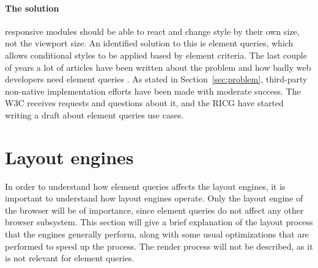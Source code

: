 \documentclass[a4paper,11pt]{kth-mag}
\begin{document}
        \paragraph{The solution}
        \Gls{responsive} modules should be able to react and change style by their own size, not the \gls{viewport} size.
        An identified solution to this is element queries, which allows conditional styles to be applied based by \gls{element} criteria.
        The last couple of years a lot of articles have been written about the problem and how badly \gls{web} developers need element queries \cite{eq_article_localised-css,eq_article_backalley,eq_article_mqhack,eq_article_tabatkjr,eq_article_filament,eq_article_tyson,eq_article_neal,eq_article_css-tricks,eq_article_hugo,eq_article_fremycompany,eq_article_discource,eq_article_matt}.
        As stated in Section~\ref{sec:problem}, \gls{third-party} non-\gls{native} implementation efforts have been made with moderate success.
        The \gls{W3C} receives requests and questions about it, and the \gls{RICG} have started writing a draft \cite{ricg_draft} about element queries use cases.

    \section{Layout engines}\label{sec:layout-engines}
      In order to understand how element queries affects the \glspl{layout engine}, it is important to understand how \glspl{layout engine} operate.
      Only the \gls{layout engine} of the \gls{browser} will be of importance, since element queries do not affect any other \gls{browser} subsystem.
      This section will give a brief explanation of the layout process that the engines generally perform, along with some usual optimizations that are performed to speed up the process.
      The render process will not be described, as it is not relevant for element queries.
\end{document}
